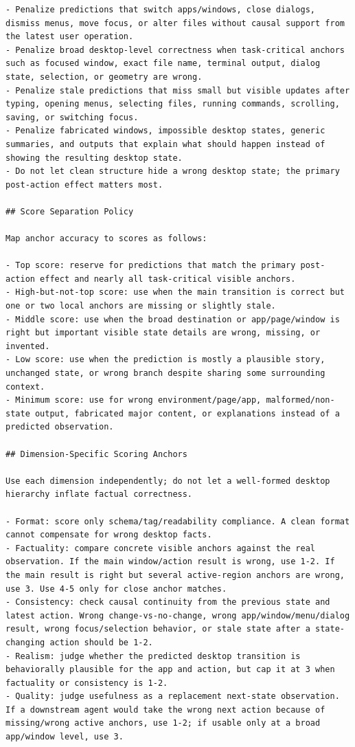 \begin{lstlisting}
- Penalize predictions that switch apps/windows, close dialogs, dismiss menus, move focus, or alter files without causal support from the latest user operation.
- Penalize broad desktop-level correctness when task-critical anchors such as focused window, exact file name, terminal output, dialog state, selection, or geometry are wrong.
- Penalize stale predictions that miss small but visible updates after typing, opening menus, selecting files, running commands, scrolling, saving, or switching focus.
- Penalize fabricated windows, impossible desktop states, generic summaries, and outputs that explain what should happen instead of showing the resulting desktop state.
- Do not let clean structure hide a wrong desktop state; the primary post-action effect matters most.

## Score Separation Policy

Map anchor accuracy to scores as follows:

- Top score: reserve for predictions that match the primary post-action effect and nearly all task-critical visible anchors.
- High-but-not-top score: use when the main transition is correct but one or two local anchors are missing or slightly stale.
- Middle score: use when the broad destination or app/page/window is right but important visible state details are wrong, missing, or invented.
- Low score: use when the prediction is mostly a plausible story, unchanged state, or wrong branch despite sharing some surrounding context.
- Minimum score: use for wrong environment/page/app, malformed/non-state output, fabricated major content, or explanations instead of a predicted observation.

## Dimension-Specific Scoring Anchors

Use each dimension independently; do not let a well-formed desktop hierarchy inflate factual correctness.

- Format: score only schema/tag/readability compliance. A clean format cannot compensate for wrong desktop facts.
- Factuality: compare concrete visible anchors against the real observation. If the main window/action result is wrong, use 1-2. If the main result is right but several active-region anchors are wrong, use 3. Use 4-5 only for close anchor matches.
- Consistency: check causal continuity from the previous state and latest action. Wrong change-vs-no-change, wrong app/window/menu/dialog result, wrong focus/selection behavior, or stale state after a state-changing action should be 1-2.
- Realism: judge whether the predicted desktop transition is behaviorally plausible for the app and action, but cap it at 3 when factuality or consistency is 1-2.
- Quality: judge usefulness as a replacement next-state observation. If a downstream agent would take the wrong next action because of missing/wrong active anchors, use 1-2; if usable only at a broad app/window level, use 3.


\end{lstlisting}
